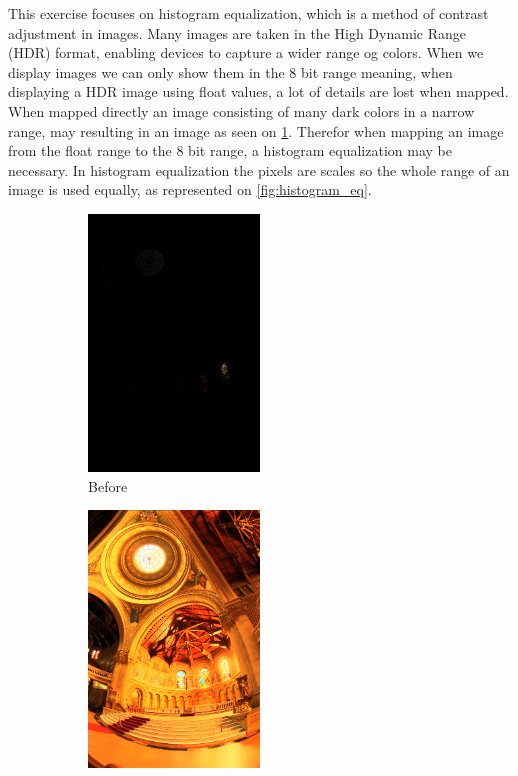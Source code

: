 This exercise focuses on histogram equalization, which is a method of contrast adjustment in images. Many images are taken in the High Dynamic Range (HDR) format, enabling devices to capture a wider range og colors. When we display images we can only show them in the 8 bit range meaning, when displaying a HDR image using float values, a lot of details are lost when mapped. When mapped directly an image consisting of many dark colors in a narrow range, may resulting in an image as seen on \cref{fig:ex3-before}.
Therefor when mapping an image from the float range to the 8 bit range, a histogram equalization may be necessary. In histogram equalization the pixels are scales so the whole range of an image is used equally, as represented on \cref{fig:histogram_eq}. 

\begin{figure}[ht]
	\centering
	\begin{subfigure}{.5\textwidth}
		\centering
		\includegraphics[width=0.5\textwidth]{figs/exercises/ex3/memorial_raw.png}
		\caption{Before}
		\label{fig:ex3-before}
	\end{subfigure}%
	\begin{subfigure}{.5\textwidth}
		\centering
		\includegraphics[width=0.5\textwidth]{figs/exercises/ex3/memorial_gold.png}

\end{subfigure}
\end{figure}

